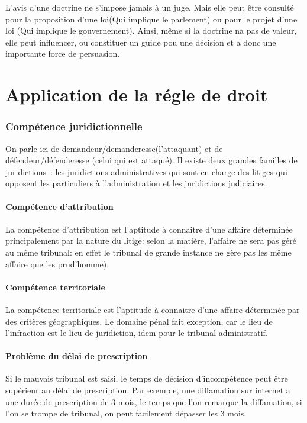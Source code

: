\documentclass[a4paper]{article}
\begin{document}
				L'avis d'une doctrine ne s'impose jamais à un juge. Mais elle peut être consulté pour la proposition d'une loi(Qui implique le parlement) ou pour le projet d'une loi (Qui implique le gouvernement). Ainsi, même si la doctrine na pas de valeur, elle peut influencer, ou constituer un guide pou une décision et a donc une importante force de persuasion. 
	\newpage\part{Application de la régle de droit}
		\section{Compétence juridictionnelle}
			On parle ici de demandeur/demanderesse(l'attaquant) et de défendeur/défenderesse (celui qui est attaqué). Il existe deux grandes familles de juridictions : les juridictions administratives qui sont en charge des litiges qui opposent les particuliers à l'administration et les juridictions judiciaires.			
			\subsection{Compétence d'attribution}
				La compétence d'attribution est l'aptitude à connaitre d'une affaire déterminée principalement par la nature du litige: selon la matière, l'affaire ne sera pas géré au même tribunal: en effet le tribunal de grande instance ne gère pas les même affaire que les prud'homme).
			\subsection{Compétence territoriale}
				La compétence territoriale est l'aptitude à connaitre d'une affaire déterminée par des critères géographiques. Le domaine pénal fait exception, car le lieu de l'infraction est le lieu de juridiction, idem pour le tribunal administratif. 
			\subsection{Problème du délai de prescription}
				Si le mauvais tribunal est saisi, le temps de décision d'incompétence peut être supérieur au délai de prescription. Par exemple, une diffamation sur internet a une durée de prescription de 3 mois, le temps que l'on remarque la diffamation, si l'on se trompe de tribunal, on peut facilement dépasser les 3 mois. 
\end{document}

